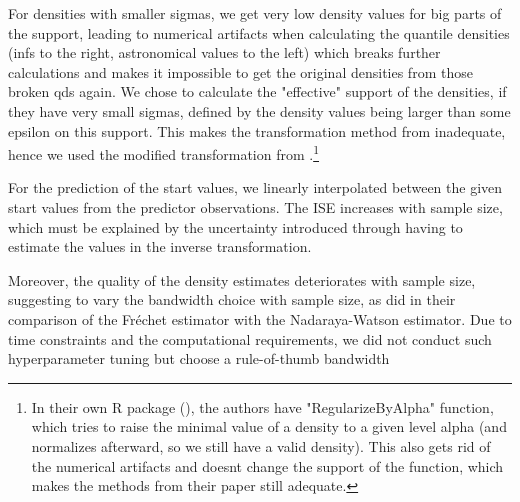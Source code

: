 For densities with smaller sigmas, we get very low density values for big parts of the
support, leading to numerical artifacts when calculating the quantile densities (infs
to the right, astronomical values to the left) which breaks further calculations and
makes it impossible to get the original densities from those broken qds again. We chose
to calculate the "effective" support of the densities, if they have very small sigmas,
defined by the density values being larger than some epsilon on this support. This
makes the transformation method from \textcite{PetersenMüller2016} inadequate, hence we
used the modified transformation from \textcite{KokoszkaEtAl2019}.\footnote{In their own R
package (), the authors have "RegularizeByAlpha" function, which tries to raise the minimal
value of a density to a given level alpha (and normalizes afterward, so we still have a
valid density). This also gets rid of the numerical artifacts and doesnt change the
support of the function, which makes the methods from their paper still adequate.}

For the prediction of the start values, we linearly interpolated between the given start
values from the predictor observations. The ISE increases with sample size, which must
be explained by the uncertainty introduced through having to estimate the values in the
inverse transformation.

Moreover, the quality of the density estimates deteriorates with sample size, suggesting
to vary the bandwidth choice with sample size, as \textcite{PetersenMüller2019} did in
their comparison of the Fréchet estimator with the Nadaraya-Watson estimator. Due to
time constraints and the computational requirements, we did not conduct such
hyperparameter tuning but choose a rule-of-thumb bandwidth
\parencites[Chapter~3.4.1]{Silverman1986}[Chapter~2.2.1]{LiRacine2007}
